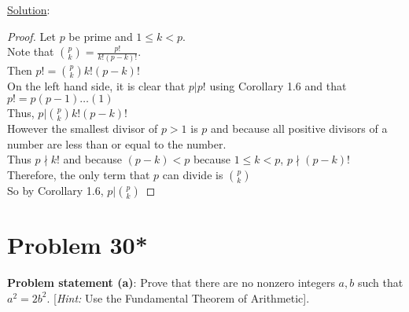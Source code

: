 \documentclass{article} %
\begin{document}
\underline{Solution}: 
\begin{addmargin}[1em]{0em}
\begin{proof}
Let $p$ be prime and $1 \leq k < p$.
\\Note that $\binom{p}{k} = \frac{p!}{k!(p-k)!}$.
\\Then $p! = \binom{p}{k}k!(p-k)!$
\\On the left hand side, it is clear that $p|p!$ using Corollary 1.6 and that $p! = p(p-1) \ldots (1)$
\\Thus, $p|\binom{p}{k}k!(p-k)!$
\\However the smallest divisor of $p > 1$ is $p$ and because all positive divisors of a number are less than or equal to the number.
\\Thus $p \nmid k!$ and because $(p-k) < p$ because $1 \leq k < p$, $p \nmid (p-k)!$
\\Therefore, the only term that $p$ can divide is $\binom{p}{k}$
\\So by Corollary 1.6, $p|\binom{p}{k}$
\end{proof}
\end{addmargin}

\newpage

\section*{Problem 30*}


\textbf{Problem statement (a)}:  Prove that there are no nonzero integers $a,b$ such that $a^2 = 2b^2$.  [\textit{Hint:} Use the Fundamental Theorem of Arithmetic].
\\
\end{document}
